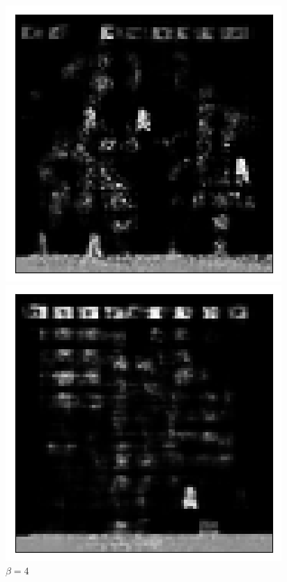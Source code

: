 \begin{figure}[h!]
\centering
\captionsetup{justification=centering}
\begin{multicols}{3}
    \includegraphics[scale=0.4]{figures/results/indiscriminate_decoupling/beta_1_prior_sample_2.png}
    \caption{$\beta=1$}
    \includegraphics[scale=0.4]{figures/results/indiscriminate_decoupling/beta_4_prior_sample_0.png}
    \caption{$\beta=4$}

\end{multicols}
\end{figure}
